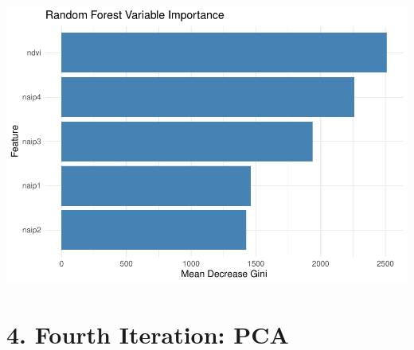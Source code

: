 \documentclass[
]{article}
\begin{document}
\includegraphics{veg_model_files/figure-latex/unnamed-chunk-13-3.pdf}

\section{4. Fourth Iteration: PCA}\label{fourth-iteration-pca}
\end{document}
